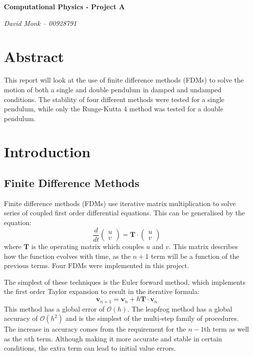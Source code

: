\documentclass[a4paper,11pt]{article}
\renewcommand{\vec}[1]{\mathbf{#1}}
\begin{document}
	\setcounter{secnumdepth}{0}
	\doublespacing
	\centering
	{\huge\bfseries Computational Physics - Project A}
	
	\emph{David Monk -- 00928791}
	
	\onehalfspacing
	\justify
	\section{Abstract}
	This report will look at the use of finite difference methods (FDMs) to solve the motion of both a single and double pendulum in damped and undamped conditions. The stability of four different methods were tested for a single pendulum, while only the Runge-Kutta 4 method was tested for a double pendulum.
	\section{Introduction}
	\subsection{Finite Difference Methods}
	Finite difference methods (FDMs) use iterative matrix multiplication to solve series of coupled first order differential equations. This can be generalised by the equation:
	\begin{equation}
	\frac{d}{dt}\begin{pmatrix}u\\v\end{pmatrix} = \vec{T}\cdot\begin{pmatrix}u\\v\end{pmatrix}
	\end{equation}
	where $\vec{T}$ is the operating matrix which couples $u$ and $v$. This matrix describes how the function evolves with time, as the $n+1$ term will be a function of the previous terms. Four FDMs were implemented in this project.
	
	The simplest of these techniques is the Euler forward method, which implements the first order Taylor expansion to result in the iterative formula: 
	\begin{equation}
	\vec{v}_{n+1} = \vec{v}_{n} + h\vec{T}\cdot\vec{v}_{n}
	\end{equation}
	This method has a global error of $\mathcal{O}\left(h\right)$. The leapfrog method has a global accuracy of $\mathcal{O}\left(h^2\right)$ and is the simplest of the multi-step family of procedures. The increase in accuracy comes from the requirement for the $n-1$th term as well as the $n$th term. Although making it more accurate and stable in certain conditions\cite{birdsall2004plasma}, the extra term can  lead to initial value errors.
	
\end{document}
